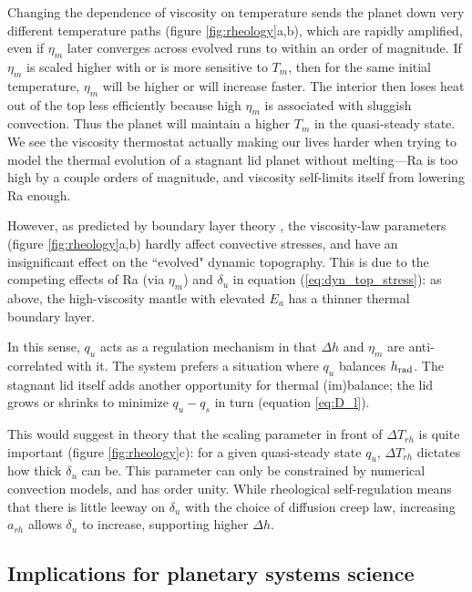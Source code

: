 Changing the dependence of viscosity on temperature sends the planet down very different temperature paths (figure \ref{fig:rheology}a,b), which are rapidly amplified, even if $\eta_m$ later converges across evolved runs to within an order of magnitude. If $\eta_m$ is scaled higher with or is more sensitive to $T_m$, then for the same initial temperature, $\eta_m$ will be higher or will increase faster. The interior then loses heat out of the top less efficiently because high $\eta_m$ is associated with sluggish convection. Thus the planet will maintain a higher $T_m$ in the quasi-steady state. We see the viscosity thermostat actually making our lives harder when trying to model the thermal evolution of a stagnant lid planet without melting---Ra is too high by a couple orders of magnitude, and viscosity self-limits itself from lowering Ra enough.

However, as predicted by boundary layer theory \citep{Solomatov1995, Reese2005}, the viscosity-law parameters (figure \ref{fig:rheology}a,b) hardly affect convective stresses, and have an insignificant effect on the ``evolved" dynamic topography. This is due to the competing effects of Ra (via $\eta_m$) and $\delta_{u}$ in equation (\ref{eq:dyn_top_stress}): as above, the high-viscosity mantle with elevated $E_a$ has a thinner thermal boundary layer.

In this sense, $q_{u}$ acts as a regulation mechanism in that $\Delta h$ and $\eta_m$ are anti-correlated with it. The system prefers a situation where $q_{u}$ balances $h_{\rm rad}$. The stagnant lid itself adds another opportunity for thermal (im)balance; the lid grows or shrinks to minimize $q_{u} - q_{s}$ in turn (equation \ref{eq:D_l}).

This would suggest in theory that the scaling parameter in front of $\Delta T_{rh}$ is quite important (figure \ref{fig:rheology}c): for a given quasi-steady state $q_{u}$, $\Delta T_{rh}$ dictates how thick $\delta_{u}$ can be. This parameter can only be constrained by numerical convection models, and has order unity. While rheological self-regulation means that there is little leeway on $\delta_{u}$ with the choice of diffusion creep law, increasing $a_{rh}$ allows $\delta_{u}$ to increase, supporting higher $\Delta h$.


\subsection{Implications for planetary systems science}

